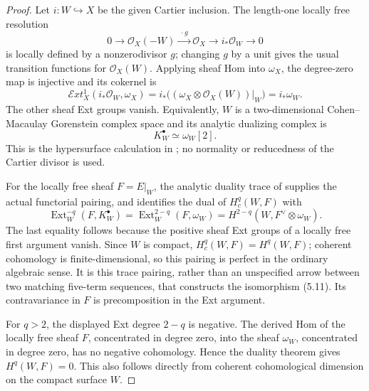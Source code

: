 %

\begin{proof}
Let \(i:W\hookrightarrow X\) be the given Cartier inclusion.  The
length-one locally free resolution
\[
 0\longrightarrow\mathcal O_X(-W)
 \xrightarrow{\;\cdot g\;}\mathcal O_X
 \longrightarrow i_*\mathcal O_W\longrightarrow0
\]
is locally defined by a nonzerodivisor \(g\); changing \(g\) by a unit
gives the usual transition functions for \(\mathcal O_X(W)\).
Applying sheaf Hom into \(\omega_X\), the degree-zero map is
injective and its cokernel is
\[
 \mathcal E xt^1_X(i_*\mathcal O_W,\omega_X)
 =i_*\bigl((\omega_X\otimes\mathcal O_X(W))|_W\bigr)
 =i_*\omega_W.
\]
The other sheaf Ext groups vanish.  Equivalently, \(W\) is a
two-dimensional Cohen--Macaulay Gorenstein complex space and its
analytic dualizing complex is
\[
 K_W^\bullet\simeq\omega_W[2].
\]
This is the hypersurface calculation in
\cite[Proposition~2 and pp.~90--91]{RamisRuget1970}; no normality or
reducedness of the Cartier divisor is used.

For the locally free sheaf \(F=E|_W\), the analytic duality trace of
\cite[Theorem~2, pp.~82--83]{RamisRuget1970} supplies the actual
functorial pairing, and identifies the dual of \(H_c^q(W,F)\) with
\[
 \operatorname{Ext}^{-q}_W(F,K_W^\bullet)
 =\operatorname{Ext}^{2-q}_W(F,\omega_W)
 =H^{2-q}(W,F^\vee\otimes\omega_W).
\]
The last equality follows because the positive sheaf Ext groups
of a locally free first argument vanish.  Since \(W\) is compact,
\(H_c^q(W,F)=H^q(W,F)\); coherent cohomology is finite-dimensional,
so this pairing is perfect in the ordinary algebraic sense.
It is this trace pairing, rather than an unspecified arrow between
two matching five-term sequences, that constructs the isomorphism
(5.11).  Its contravariance in \(F\) is precomposition in the Ext
argument.

For \(q>2\), the displayed Ext degree \(2-q\) is negative.  The
derived Hom of the locally free sheaf \(F\), concentrated in degree
zero, into the sheaf \(\omega_W\), concentrated in degree zero, has
no negative cohomology.  Hence the duality theorem gives
\(H^q(W,F)=0\).  This also follows directly from coherent
cohomological dimension on the compact surface \(W\).
\end{proof}

